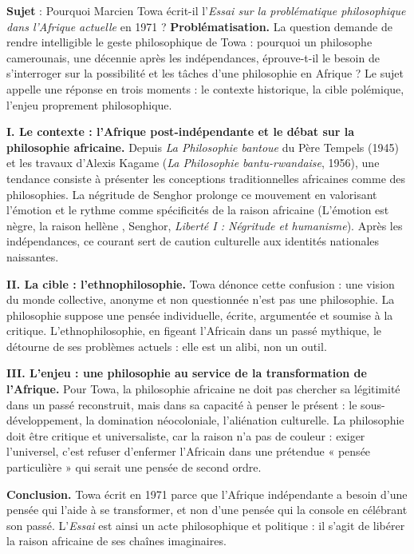 \documentclass[11pt]{article}
\begin{document}
\begin{exoresolu}
\textbf{Sujet} : Pourquoi Marcien Towa écrit-il l'\emph{Essai sur la problématique philosophique dans l'Afrique actuelle} en 1971 ?
\tcblower
\textbf{Problématisation.} La question demande de rendre intelligible le geste philosophique de Towa : pourquoi un philosophe camerounais, une décennie après les indépendances, éprouve-t-il le besoin de s'interroger sur la possibilité et les tâches d'une philosophie en Afrique ? Le sujet appelle une réponse en trois moments : le contexte historique, la cible polémique, l'enjeu proprement philosophique.

\textbf{I. Le contexte : l'Afrique post-indépendante et le débat sur la philosophie africaine.}
Depuis \emph{La Philosophie bantoue} du Père Tempels (1945) et les travaux d'Alexis Kagame (\emph{La Philosophie bantu-rwandaise}, 1956), une tendance consiste à présenter les conceptions traditionnelles africaines comme des philosophies. La négritude de Senghor prolonge ce mouvement en valorisant l'émotion et le rythme comme spécificités de la raison africaine (\guillemotleft L'émotion est nègre, la raison hellène \guillemotright, Senghor, \emph{Liberté I : Négritude et humanisme}). Après les indépendances, ce courant sert de caution culturelle aux identités nationales naissantes.

\textbf{II. La cible : l'ethnophilosophie.}
Towa dénonce cette confusion : une vision du monde collective, anonyme et non questionnée n'est pas une philosophie. La philosophie suppose une pensée individuelle, écrite, argumentée et soumise à la critique. L'ethnophilosophie, en figeant l'Africain dans un passé mythique, le détourne de ses problèmes actuels : elle est un alibi, non un outil.

\textbf{III. L'enjeu : une philosophie au service de la transformation de l'Afrique.}
Pour Towa, la philosophie africaine ne doit pas chercher sa légitimité dans un passé reconstruit, mais dans sa capacité à penser le présent : le sous-développement, la domination néocoloniale, l'aliénation culturelle. La philosophie doit être critique et universaliste, car la raison n'a pas de couleur : exiger l'universel, c'est refuser d'enfermer l'Africain dans une prétendue « pensée particulière » qui serait une pensée de second ordre.

\textbf{Conclusion.} Towa écrit en 1971 parce que l'Afrique indépendante a besoin d'une pensée qui l'aide à se transformer, et non d'une pensée qui la console en célébrant son passé. L'\emph{Essai} est ainsi un acte philosophique et politique : il s'agit de libérer la raison africaine de ses chaînes imaginaires.
\end{exoresolu}
\end{document}
